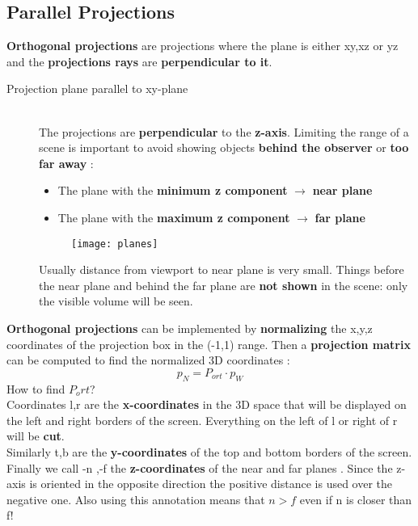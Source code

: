 \subsection{Parallel Projections}
\textbf{Orthogonal projections} are projections where the plane is either xy,xz or yz and the \textbf{projections rays} are \textbf{perpendicular to it}.
\begin{description}
\item[Projection plane parallel to xy-plane]\hfill\\
The projections are \textbf{perpendicular} to the \textbf{z-axis}.
Limiting the range of a scene is important to avoid showing objects \textbf{behind the observer} or \textbf{too far away} :
\begin{itemize}
\item The plane with the \textbf{minimum z component } $\to$ \textbf{near plane}
\item The plane with the \textbf{maximum z component } $\to$ \textbf{far plane}
\end{itemize}
\begin{figure}[H]
 \centering
  \texttt{[image: planes]}
\end{figure}
Usually distance from viewport to near plane is very small. Things before the near plane and behind the far plane are \textbf{not shown} in the scene: only the visible volume will be seen.\\
\end{description}
\textbf{Orthogonal projections} can be implemented by \textbf{normalizing} the x,y,z coordinates of the projection box in the (-1,1) range. Then a \textbf{projection matrix} can be computed to find the normalized 3D coordinates :
$$ p_N = P_{ort}\cdot p_W$$
How to find $P_ort $?\\
Coordinates l,r are the \textbf{x-coordinates} in the 3D space that will be displayed on the left and right borders of the screen. Everything on the left of l or right of r will be \textbf{cut}.\\
Similarly t,b are the \textbf{y-coordinates} of the top and bottom borders of the screen.\\
Finally we call -n ,-f the \textbf{z-coordinates} of the near and far planes . Since the z-axis is oriented in the opposite direction the positive distance is used over the negative one. Also using this annotation means that $n>f$ even if n is closer than f!